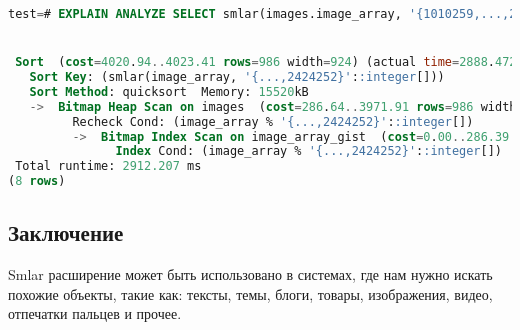 \begin{lstlisting}[language=SQL,label=lst:smlar11,caption=Добавляем сортировку по сходству картинок]
test=# EXPLAIN ANALYZE SELECT smlar(images.image_array, '{1010259,...,2424252}'::int[]) as similarity FROM images WHERE images.image_array % '{1010259,1011253, ...,2423253,2424252}'::int[] ORDER BY similarity DESC;


 Sort  (cost=4020.94..4023.41 rows=986 width=924) (actual time=2888.472..2901.977 rows=200000 loops=1)
   Sort Key: (smlar(image_array, '{...,2424252}'::integer[]))
   Sort Method: quicksort  Memory: 15520kB
   ->  Bitmap Heap Scan on images  (cost=286.64..3971.91 rows=986 width=924) (actual time=474.436..2729.638 rows=200000 loops=1)
         Recheck Cond: (image_array % '{...,2424252}'::integer[])
         ->  Bitmap Index Scan on image_array_gist  (cost=0.00..286.39 rows=986 width=0) (actual time=421.140..421.140 rows=200000 loops=1)
               Index Cond: (image_array % '{...,2424252}'::integer[])
 Total runtime: 2912.207 ms
(8 rows)
\end{lstlisting}


\subsection{Заключение}

Smlar расширение может быть использовано в системах, где нам нужно искать похожие объекты, такие как: тексты, темы, блоги, товары, изображения, видео, отпечатки пальцев и прочее.
